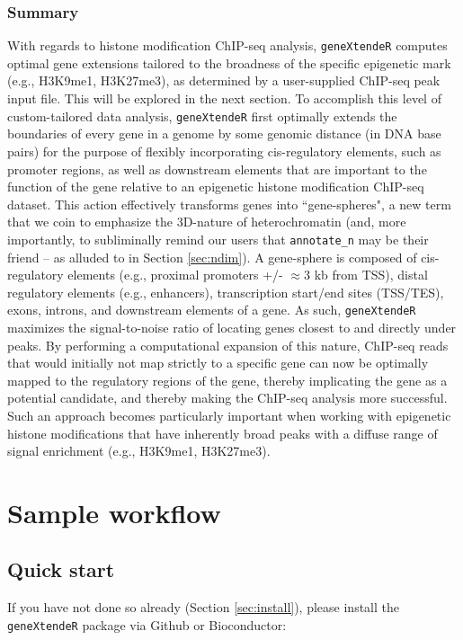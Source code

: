 \documentclass[12pt]{article}
\begin{document}
\subsubsection{Summary}
With regards to histone modification ChIP-seq analysis, \texttt{geneXtendeR} computes optimal gene extensions tailored to the broadness of the specific epigenetic mark (e.g., H3K9me1, H3K27me3), as determined by a user-supplied ChIP-seq peak input file.  This will be explored in the next section.  To accomplish this level of custom-tailored data analysis, \texttt{geneXtendeR} first optimally extends the boundaries of every gene in a genome by some genomic distance (in DNA base pairs) for the purpose of flexibly incorporating cis-regulatory elements, such as promoter regions, as well as downstream elements that are important to the function of the gene relative to an epigenetic histone modification ChIP-seq dataset.  This action effectively transforms genes into ``gene-spheres", a new term that we coin to emphasize the 3D-nature of heterochromatin (and, more importantly, to subliminally remind our users that \texttt{annotate\_n} may be their friend -- as alluded to in Section \ref{sec:ndim}).  A gene-sphere is composed of cis-regulatory elements (e.g., proximal promoters +/- $\approx 3$ kb from TSS), distal regulatory elements (e.g., enhancers), transcription start/end sites (TSS/TES), exons, introns, and downstream elements of a gene.  As such, \texttt{geneXtendeR} maximizes the signal-to-noise ratio of locating genes closest to and directly under peaks. By performing a computational expansion of this nature, ChIP-seq reads that would initially not map strictly to a specific gene can now be optimally mapped to the regulatory regions of the gene, thereby implicating the gene as a potential candidate, and thereby making the ChIP-seq analysis more successful. Such an approach becomes particularly important when working with epigenetic histone modifications that have inherently broad peaks with a diffuse range of signal enrichment (e.g., H3K9me1, H3K27me3). 


\section{Sample workflow}

\subsection{Quick start} \label{sec:qs}

If you have not done so already (Section \ref{sec:install}), please install the \texttt{geneXtendeR} package via Github or Bioconductor:
\end{document}

